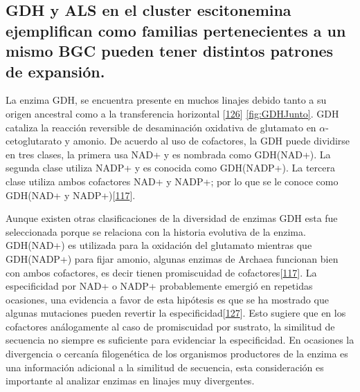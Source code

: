 \documentclass[12pt,twoside]{reedthesis}
\begin{document}
  \subsection{GDH y ALS en el cluster escitonemina ejemplifican como
  familias pertenecientes a un mismo BGC pueden tener distintos patrones
  de
  expansión.}\label{gdh-y-als-en-el-cluster-escitonemina-ejemplifican-como-familias-pertenecientes-a-un-mismo-bgc-pueden-tener-distintos-patrones-de-expansion.}
  
  La enzima GDH, se encuentra presente en muchos linajes debido tanto a su
  origen ancestral como a la transferencia horizontal
  {[}\protect\hyperlink{ref-andersson_evolution_2003}{126}{]}
  \autoref{fig:GDHJunto}. GDH cataliza la reacción reversible de
  desaminación oxidativa de glutamato en \(\alpha\)-cetoglutarato y
  amonio. De acuerdo al uso de cofactores, la GDH puede dividirse en tres
  clases, la primera usa NAD+ y es nombrada como GDH(NAD+). La segunda
  clase utiliza NADP+ y es conocida como GDH(NADP+). La tercera clase
  utiliza ambos cofactores NAD+ y NADP+; por lo que se le conoce como
  GDH(NAD+ y
  NADP+){[}\protect\hyperlink{ref-engel_glutamate_2014}{117}{]}.
  
  Aunque existen otras clasificaciones de la diversidad de enzimas GDH
  esta fue seleccionada porque se relaciona con la historia evolutiva de
  la enzima. GDH(NAD+) es utilizada para la oxidación del glutamato
  mientras que GDH(NADP+) para fijar amonio, algunas enzimas de Archaea
  funcionan bien con ambos cofactores, es decir tienen promiscuidad de
  cofactores{[}\protect\hyperlink{ref-engel_glutamate_2014}{117}{]}. La
  especificidad por NAD+ o NADP+ probablemente emergió en repetidas
  ocasiones, una evidencia a favor de esta hipótesis es que se ha mostrado
  que algunas mutaciones pueden revertir la
  especificidad{[}\protect\hyperlink{ref-lilley_partial_1991}{127}{]}.
  Esto sugiere que en los cofactores análogamente al caso de promiscuidad
  por sustrato, la similitud de secuencia no siempre es suficiente para
  evidenciar la especificidad. En ocasiones la divergencia o cercanía
  filogenética de los organismos productores de la enzima es una
  información adicional a la similitud de secuencia, esta consideración es
  importante al analizar enzimas en linajes muy divergentes.
  
\end{document}
